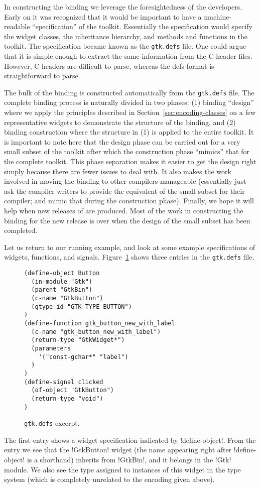 \documentclass[workingdraft]{usetex-v1}
\begin{document}
In constructing the \mgtk binding we leverage the foresightedness of
the \gtk developers. Early on it was recognized that it would be
important to have a machine-readable ``specification'' of the toolkit.
Essentially the specification would specify the widget classes, the
inheritance hierarchy, and methods and functions in the toolkit. The
specification became known as the \texttt{gtk.defs} file. One could
argue that it is simple enough to extract the same information from
the C header files. However, C headers are difficult to parse, whereas
the defs format is straightforward to parse.

The bulk of the \mgtk binding is constructed automatically from the
\texttt{gtk.defs} file.  The complete binding process is naturally
divided in two phases: (1) binding ``design'' where we apply the
principles described in Section~\ref{sec:encoding-classes} on a few
representative widgets to demonstrate the structure of the binding,
and (2) binding construction where the structure in (1) is applied to
the entire toolkit. It is important to note here that the design phase
can be carried out for a very small subset of the toolkit after which
the construction phase ``mimics'' that for the complete toolkit.
This phase separation makes it easier to get the design right simply
because there are fewer issues to deal with.  It also makes the work
involved in moving the binding to other \sml compilers manageable
(essentially just ask the compiler writers to provide the equivalent
of the small subset for their compiler; and mimic that during the
construction phase). Finally, we hope it will help when new releases
of \gtk are produced. Most of the work in constructing the binding for
the new release is over when the design of the small subset has been
completed.

Let us return to our running example, and look at some example
specifications of widgets, functions, and signals. Figure~\ref{fig:gtk-defs}
shows three entries in the \texttt{gtk.defs} file.
\begin{figure}[htbp]
\begin{centering}
\begin{verbatim}
(define-object Button
  (in-module "Gtk")
  (parent "GtkBin")
  (c-name "GtkButton")
  (gtype-id "GTK_TYPE_BUTTON")
)
(define-function gtk_button_new_with_label
  (c-name "gtk_button_new_with_label")
  (return-type "GtkWidget*")
  (parameters
    '("const-gchar*" "label")
  )
)
(define-signal clicked
  (of-object "GtkButton")
  (return-type "void")
)
\end{verbatim}
\caption{\texttt{gtk.defs} excerpt.\label{fig:gtk-defs}}
\end{centering}
\end{figure}
The first entry shows a widget specification indicated by
!define-object!. From the entry we see that the !GtkButton! widget
(the name appearing right after !define-object! is a shorthand)
inherits from !GtkBin!, and it belongs in the !Gtk! module.  We also
see the type assigned to instances of this widget in the \gtk type
system (which is completely unrelated to the \sml encoding given
above).
\end{document}
